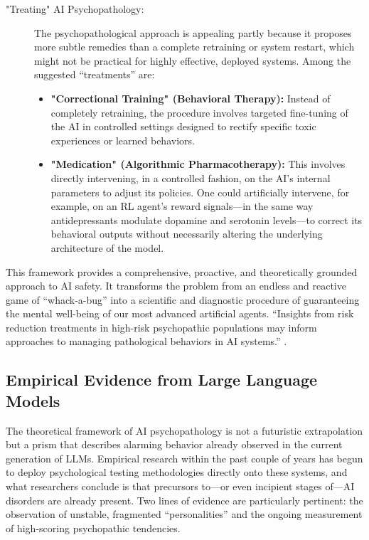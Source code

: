 \documentclass{article}
\begin{document}
\begin{description}
    \item["Treating" AI Psychopathology:] The psychopathological approach is appealing partly because it proposes more subtle remedies than a complete retraining or system restart, which might not be practical for highly effective, deployed systems. Among the suggested “treatments” are:
    \begin{itemize}
        \item \textbf{"Correctional Training" (Behavioral Therapy):} Instead of completely retraining, the procedure involves targeted fine-tuning of the AI in controlled settings designed to rectify specific toxic experiences or learned behaviors.
        \item \textbf{"Medication" (Algorithmic Pharmacotherapy):} This involves directly intervening, in a controlled fashion, on the AI's internal parameters to adjust its policies. One could artificially intervene, for example, on an RL agent's reward signals—in the same way antidepressants modulate dopamine and serotonin levels—to correct its behavioral outputs without necessarily altering the underlying architecture of the model.
    \end{itemize}
\end{description}
This framework provides a comprehensive, proactive, and theoretically grounded approach to AI safety. It transforms the problem from an endless and reactive game of “whack-a-bug” into a scientific and diagnostic procedure of guaranteeing the mental well-being of our most advanced artificial agents. “Insights from risk reduction treatments in high-risk psychopathic populations may inform approaches to managing pathological behaviors in AI systems.” \citep{ref16}.

\subsection{Empirical Evidence from Large Language Models}
The theoretical framework of AI psychopathology is not a futuristic extrapolation but a prism that describes alarming behavior already observed in the current generation of LLMs. Empirical research within the past couple of years has begun to deploy psychological testing methodologies directly onto these systems, and what researchers conclude is that precursors to—or even incipient stages of—AI disorders are already present. Two lines of evidence are particularly pertinent: the observation of unstable, fragmented “personalities” and the ongoing measurement of high-scoring psychopathic tendencies.
\end{document}

